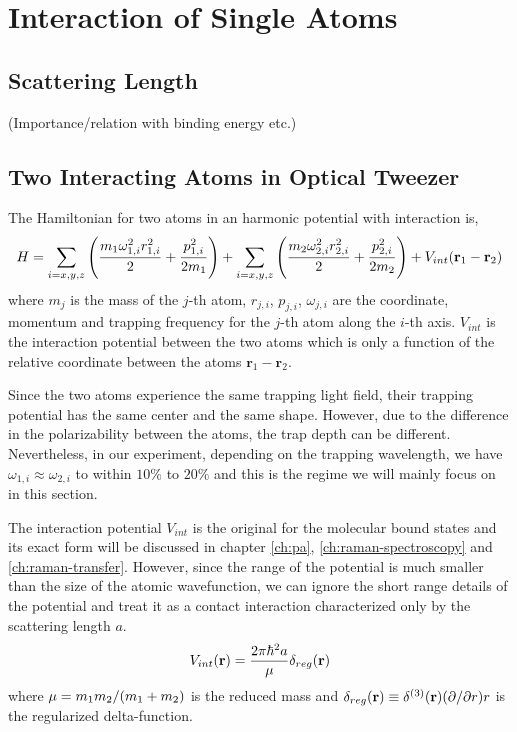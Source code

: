 
\chapter{Interaction of Single Atoms}
\label{ch:interaction-shift}

\section{Scattering Length}
(Importance/relation with binding energy etc.)

\section{Two Interacting Atoms in Optical Tweezer}

The Hamiltonian for two atoms in an harmonic potential with interaction is,
\[
  H=\sum_{i=x,y,z}{\left({\frac{m_{1}\omega_{1,i}^2r_{1,i}^2}{2}+\frac{p_{1,i}^2}{2m_{1}}}\right)}+\sum_{i=x,y,z}{\left({\frac{m_{2}\omega_{2,i}^2r_{2,i}^2}{2}+\frac{p_{2,i}^2}{2m_{2}}}\right)}+V_{int}{\left({\mathbf{r}_1-\mathbf{r}_2}\right)}
\]
where $m_j$ is the mass of the $j$-th atom,
$r_{j,i}$, $p_{j,i}$, $\omega_{j,i}$ are the coordinate, momentum and trapping frequency
for the $j$-th atom along the $i$-th axis.
$V_{int}$ is the interaction potential between the two atoms which is only a function
of the relative coordinate between the atoms $\mathbf{r}_1-\mathbf{r}_2$.

Since the two atoms experience the same trapping light field,
their trapping potential has the same center and the same shape.
However, due to the difference in the polarizability between the atoms,
the trap depth can be different.
Nevertheless, in our experiment, depending on the trapping wavelength,
we have $\omega_{1,i}\approx\omega_{2,i}$ to within $10\%$ to $20\%$
and this is the regime we will mainly focus on in this section.

The interaction potential $V_{int}$ is the original for
the molecular bound states and its exact form will be discussed in chapter \ref{ch:pa},
\ref{ch:raman-spectroscopy} and \ref{ch:raman-transfer}.
However, since the range of the potential is much smaller than
the size of the atomic wavefunction, we can ignore the short range details of the potential
and treat it as a contact interaction characterized only by the scattering length $a$.
\[
  V_{int}{\left({\mathbf{r}}\right)}=\frac{2\pi\hbar^2a}{\mu}\delta_{reg}{\left({\mathbf{r}}\right)}
\]
where $\mu = m_1m_2/{\left({m_1+m_2}\right)}$ is the reduced mass and
$\delta_{reg}{\left({\mathbf{r}}\right)}\equiv\delta^{(3)}{\left({\mathbf{r}}\right)}{\left({\partial/\partial r}\right)}r$
is the regularized delta-function.


